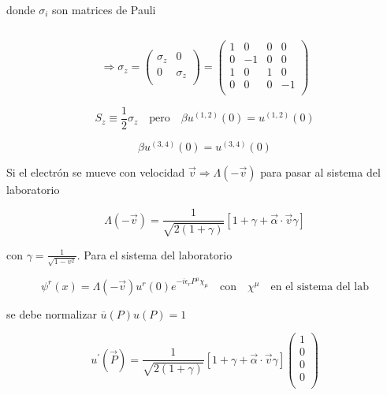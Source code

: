 \documentclass{report}
\begin{document}
donde $\sigma_i$ son matrices de Pauli

\begin{equation}
[\alpha^{i} = \left ( \begin{array}{cc}
 0 & \sigma^{i}   \\
 \sigma^{i} & 0  \\
 \end{array} \right) \quad \gamma^{i} = \left ( \begin{array}{cc}
 0 & \sigma_i   \\
 -\sigma_i & 0  \\
 \end{array} \right)]
\end{equation}

\[\Rightarrow \sigma_{z} = \left ( \begin{array}{cc}
 \sigma_{z} & 0   \\
 0 & \sigma_{z}  \\
 \end{array} \right) = \left ( \begin{array}{cccc}
 1 & 0 & 0 & 0  \\
 0 & -1 & 0 & 0 \\
 1 & 0 & 1 & 0 \\
 0 & 0 & 0 & -1 \\
 \end{array} \right)
 \]

\[S_{z} \equiv \frac{1}{2} \sigma_{z} \quad \text{pero} \quad \beta u^{(1,2)}(0) = u^{(1,2)}(0)\]

\[\beta u^{(3,4)}(0) = u^{(3,4)}(0)\]

Si el electrón se mueve con velocidad $\overrightarrow{v} \Rightarrow \Lambda (-\overrightarrow{v})$ para pasar al sistema del laboratorio

\[\Lambda (- \overrightarrow{v}) = \frac{1}{\sqrt{2(1+\gamma)}} [1+\gamma + \overrightarrow{\alpha} \cdot \overrightarrow{v} \gamma]\]

con $\gamma = \frac{1}{\sqrt{1-v^2}}$. Para el sistema del laboratorio

\[\psi^{r} (x) = \Lambda (- \overrightarrow{v}) u^{r} (0) e^{-i \epsilon_{r} P^{\mu} \chi_{\mu}} \quad \text{con} \quad \chi^{\mu} \quad \text{en el sistema del lab}\]

se debe normalizar $\overline{u}(P) u (P) = 1$

\[u ^{\prime} (\overrightarrow{P}) = \frac{1}{\sqrt{2(1+\gamma)}} [1+\gamma + \overrightarrow{\alpha} \cdot \overrightarrow{v} \gamma ] \left ( \begin{array}{cccc}
 1   \\
 0   \\
 0   \\
 0   \\
 \end{array} \right) \]
\end{document}
